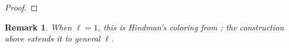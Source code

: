 \documentclass[reqno,12pt]{amsart}
\newtheorem{rem}[thm]{Remark}
\newcommand{\Nzero}{\mathbb N_0}
\def \N {\mathbb N}
\numberwithin{equation}{section}
\begin{document}
\begin{proof}
%
%
%
%
\end{proof}
\begin{rem}
	When $\ell=1$, this is Hindman's coloring from
	\cite[proof of Theorem~2.11]{Neil79}; the construction above extends it
	to general $\ell$.
\end{rem}
\end{document}

